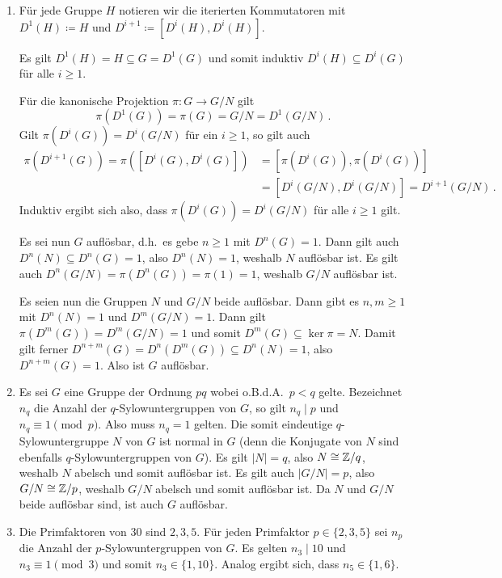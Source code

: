 \begin{solution}
  \begin{enumerate}
    \item
      Für jede Gruppe $H$ notieren wir die iterierten Kommutatoren mit $D^1(H) \coloneqq H$ und $D^{i+1} \coloneqq [D^i(H), D^i(H)]$.
      
      Es gilt $D^1(H) = H \subseteq G = D^1(G)$ und somit induktiv $D^i(H) \subseteq D^i(G)$ für alle $i \geq 1$.
      
      Für die kanonische Projektion $\pi \colon G \to G/N$ gilt
      \[
          \pi(D^1(G))
        = \pi(G)
        = G/N
        = D^1(G/N) \,.
      \]
      Gilt $\pi(D^i(G)) = D^i(G/N)$ für ein $i \geq 1$, so gilt auch
      \begin{align*}
            \pi(D^{i+1}(G))
          =  \pi( [D^i(G), D^i(G)] )
        &=  [ \pi(D^i(G)), \pi(D^i(G)) ]  \\
        &=  [ D^i(G/N), D^i(G/N) ]
          =  D^{i+1}(G/N) \,.
      \end{align*}
      Induktiv ergibt sich also, dass $\pi(D^i(G)) = D^i(G/N)$ für alle $i \geq 1$ gilt.
      
      Es sei nun $G$ auflösbar, d.h.\ es gebe $n \geq 1$ mit $D^n(G) = 1$.
      Dann gilt auch $D^n(N) \subseteq D^n(G) = 1$, also $D^n(N) = 1$, weshalb $N$ auflösbar ist.
      Es gilt auch $D^n(G/N) = \pi(D^n(G)) = \pi(1) = 1$, weshalb $G/N$ auflösbar ist.
      
      Es seien nun die Gruppen $N$ und $G/N$ beide auflösbar.
      Dann gibt es $n, m \geq 1$ mit $D^n(N) = 1$ und $D^m(G/N) = 1$.
      Dann gilt $\pi(D^m(G)) = D^m(G/N) = 1$ und somit $D^m(G) \subseteq \ker \pi = N$.
      Damit gilt ferner $D^{n+m}(G) = D^n(D^m(G)) \subseteq D^n(N) = 1$, also $D^{n+m}(G) = 1$.
      Also ist $G$ auflösbar.
    \item
      Es sei $G$ eine Gruppe der Ordnung $pq$ wobei o.B.d.A.\ $p < q$ gelte.
      Bezeichnet $n_q$ die Anzahl der $q$-Sylow\-unter\-gruppen von $G$, so gilt $n_q \mid p$ und $n_q \equiv 1 \pmod{p}$.
      Also muss $n_q = 1$ gelten.
      Die somit eindeutige $q$-Sylow\-unter\-gruppe $N$ von $G$ ist normal in $G$ (denn die Konjugate von $N$ sind ebenfalls $q$-Sylow\-unter\-gruppen von $G$).
      Es gilt $|N| = q$, also $N \cong \mathbb{Z}/q$, weshalb $N$ abelsch und somit auflösbar ist.
      Es gilt auch $|G/N| = p$, also $G/N \cong \mathbb{Z}/p$, weshalb $G/N$ abelsch und somit auflösbar ist.
      Da $N$ und $G/N$ beide auflösbar sind, ist auch $G$ auflösbar.
    \item
      Die Primfaktoren von $30$ sind $2, 3, 5$.
      Für jeden Primfaktor $p \in \{2, 3, 5\}$ sei $n_p$ die Anzahl der $p$-Sylow\-unter\-gruppen von $G$.
      Es gelten $n_3 \mid 10$ und $n_3 \equiv 1 \pmod{3}$ und somit $n_3 \in \{1, 10\}$.
      Analog ergibt sich, dass $n_5 \in \{1, 6\}$.
      

\end{enumerate}
\end{solution}
